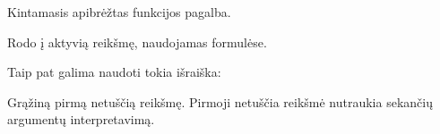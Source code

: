 \documentclass[letterpaper,10pt,lithuanian]{sphinxmanual}
\begin{document}
\begin{fulllineitems}
\label{\detokenize{formules:var}}
\pysigstartsignatures
\pysiglinewithargsret
{}
{}
{}
\pysigstopsignatures
\sphinxAtStartPar
Kintamasis apibrėžtas {\hyperref[\detokenize{formules:id16}]{}} funkcijos pagalba.

\end{fulllineitems}


\begin{fulllineitems}
\label{\detokenize{formules:self}}
\pysigstartsignatures
\pysiglinewithargsret
{}
{}
{}
\pysigstopsignatures
\sphinxAtStartPar
Rodo į aktyvią reikšmę, naudojamas {\hyperref[\detokenize{dimensijos:property.prepare}]{}} formulėse.

\end{fulllineitems}


\begin{fulllineitems}
\label{\detokenize{formules:or}}
\pysigstartsignatures
\pysiglinewithargsret
{}
{}
{}
\pysigstopsignatures
\sphinxAtStartPar
Taip pat galima naudoti tokia išraiška:

\begin{sphinxVerbatim}[commandchars=\\\{\}]
    
\end{sphinxVerbatim}

\sphinxAtStartPar
Grąžiną pirmą netuščią reikšmę. Pirmoji netuščia reikšmė nutraukia sekančių
 argumentų interpretavimą.

\end{fulllineitems}

\end{document}

